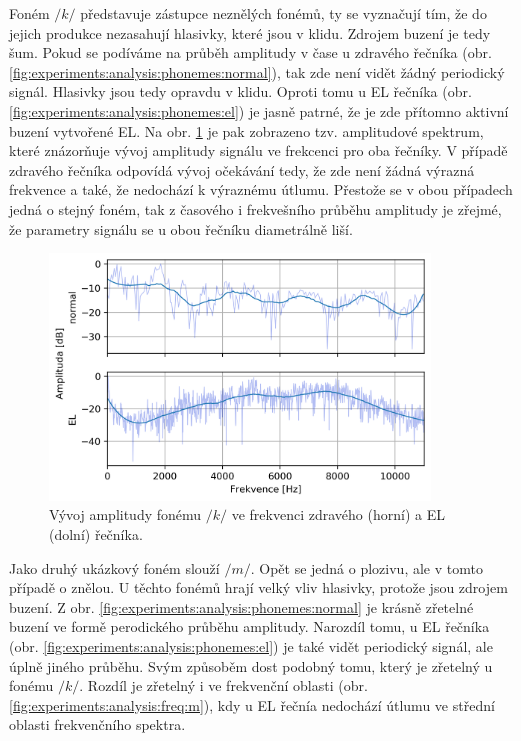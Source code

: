 Foném $/k/$ představuje zástupce neznělých fonémů, ty se vyznačují tím, že do jejich produkce nezasahují hlasivky, které jsou v klidu. Zdrojem buzení je tedy šum. Pokud se podíváme na průběh amplitudy v čase u zdravého řečníka (obr. \ref{fig:experiments:analysis:phonemes:normal}), tak zde není vidět žádný periodický signál. Hlasivky jsou tedy opravdu v klidu. Oproti tomu u EL řečníka (obr. \ref{fig:experiments:analysis:phonemes:el}) je jasně patrné, že je zde přítomno aktivní buzení vytvořené EL. Na obr. \ref{fig:experiments:analysis:freq:k} je pak zobrazeno tzv. amplitudové spektrum, které znázorňuje vývoj amplitudy signálu ve frekcenci pro oba řečníky. V případě zdravého řečníka odpovídá vývoj očekávání tedy, že zde není žádná výrazná frekvence a také, že nedochází k výraznému útlumu. Přestože se v obou případech jedná o stejný foném, tak z časového i frekvešního průběhu amplitudy je zřejmé, že parametry signálu se u obou řečníku diametrálně liší.

\begin{figure}[hbpt]
  \centering
  \includegraphics[width=0.9\textwidth]{./ch4-experiments/img/freq_analysis_(k).png}
  \caption{Vývoj amplitudy fonému $/k/$ ve frekvenci zdravého (horní) a EL (dolní) řečníka.}
  \label{fig:experiments:analysis:freq:k}
\end{figure}

Jako druhý ukázkový foném slouží $/m/$. Opět se jedná o plozivu, ale v tomto případě o znělou. U těchto fonémů hrají velký vliv hlasivky, protože jsou zdrojem buzení. Z obr. \ref{fig:experiments:analysis:phonemes:normal} je krásně zřetelné buzení ve formě perodického průběhu amplitudy. Narozdíl tomu, u EL řečníka (obr. \ref{fig:experiments:analysis:phonemes:el}) je také vidět periodický signál, ale úplně jiného průběhu. Svým způsoběm dost podobný tomu, který je zřetelný u fonému $/k/$. Rozdíl je zřetelný i ve frekvenční oblasti (obr. \ref{fig:experiments:analysis:freq:m}), kdy u EL řečnía nedochází útlumu ve střední oblasti frekvenčního spektra.

